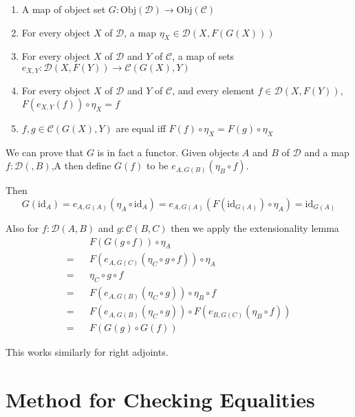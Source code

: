 \documentclass[12pt]{article} %
\theoremstyle{definition}
\theoremstyle{definition}
\theoremstyle{definition}
\theoremstyle{definition}
\begin{document}
\begin{enumerate}
  \item A map of object set $G : \text{Obj}(\mathcal{D})\to \text{Obj}(\mathcal{C})$
  \item For every object $X$ of $\mathcal{D}$, a map $\eta_X \in \mathcal{D}(X, F(G(X)))$
  \item For every object $X$ of $\mathcal{D}$ and $Y$ of $\mathcal{C}$, 
    a map of sets $e_{X,Y} : \mathcal{D}(X, F(Y)) \to \mathcal{C}(G(X), Y)$
  \item For every object $X$ of $\mathcal{D}$ and $Y$ of $\mathcal{C}$, 
    and every element $f \in \mathcal{D}(X, F(Y))$, $F(e_{X,Y}(f)) \circ \eta_X = f$
  \item $f,g \in \mathcal{C}(G(X), Y)$ are equal iff $F(f) \circ \eta_X = F(g) \circ \eta_X$
\end{enumerate}

We can prove that $G$ is in fact a functor. 
Given objects $A$ and $B$ of $\mathcal{D}$ and a map $f : \mathcal{D}(, B)$,A
then define $G(f)$ to be $e_{A,G(B)}(\eta_B \circ f)$.

Then 
\begin{equation}
  G(\text{id}_A) = e_{A,G(A)}(\eta_A \circ \text{id}_A) = 
e_{A,G(A)}(F (\text{id}_{G(A)}) \circ \eta_A) = \text{id}_{G(A)}
\end{equation}

Also for $f : \mathcal{D}(A, B)$ and $g : \mathcal{C}(B, C)$
then we apply the extensionality lemma
\begin{equation}
  \begin{aligned}
     && F(G(g \circ f)) \circ \eta_A \\
   = && F(e_{A, G(C)}(\eta_C \circ g \circ f)) \circ \eta_A \\
   = && \eta_C \circ g \circ f \\
   = && F(e_{A, G(B)}(\eta_C \circ g)) \circ \eta_B \circ f \\
   = && F(e_{A, G(B)}(\eta_C \circ g)) \circ F(e_{B, G(C)}(\eta_B \circ f)) \\
   = && F(G(g) \circ G(f))
  \end{aligned}
\end{equation}

This works similarly for right adjoints.

\section{Method for Checking Equalities}
\end{document}
